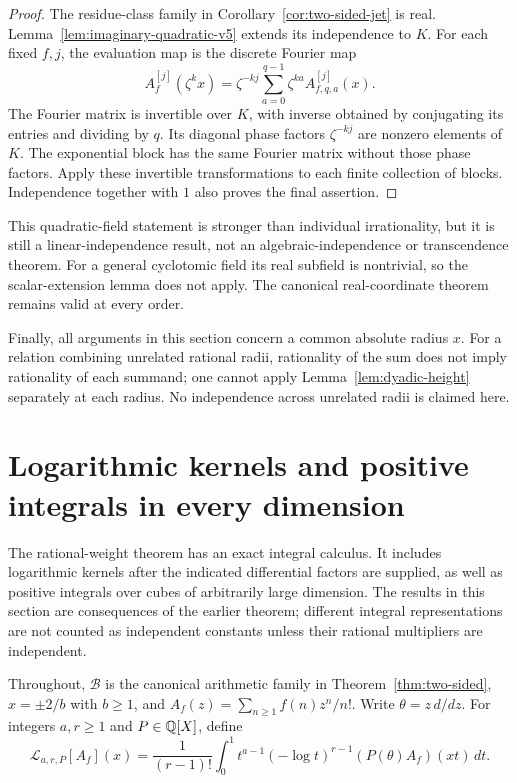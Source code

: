 \begin{proof}
The residue-class family in Corollary~\ref{cor:two-sided-jet} is real.
Lemma~\ref{lem:imaginary-quadratic-v5} extends its independence to $K$.
For each fixed $f,j$, the evaluation map is the discrete Fourier map
\[
 A_f^{[j]}(\zeta^k x)=
 \zeta^{-kj}\sum_{a=0}^{q-1}\zeta^{ka}A_{f,q,a}^{[j]}(x).
\]
The Fourier matrix is invertible over $K$, with inverse obtained
by conjugating its entries and dividing by $q$.  Its diagonal
phase factors $\zeta^{-kj}$ are nonzero elements of $K$.
The exponential block has the same Fourier matrix without those
phase factors.  Apply these invertible transformations to each
finite collection of blocks.  Independence together with $1$
also proves the final assertion.
\end{proof}

This quadratic-field statement is stronger than individual
irrationality, but it is still a linear-independence result, not an
algebraic-independence or transcendence theorem.  For a general
cyclotomic field its real subfield is nontrivial, so the scalar-extension
lemma does not apply.  The canonical real-coordinate theorem remains
valid at every order.

Finally, all arguments in this section concern a common absolute
radius $x$.  For a relation combining unrelated rational radii,
rationality of the sum does not imply rationality of each summand;
one cannot apply Lemma~\ref{lem:dyadic-height} separately at each
radius.  No independence across unrelated radii is claimed here.

\section{Logarithmic kernels and positive integrals in every dimension}
\label{sec:v5-kernel-calculus}

The rational-weight theorem has an exact integral calculus.  It includes
logarithmic kernels after the indicated differential factors are supplied,
as well as positive integrals over cubes of arbitrarily large dimension.
The results in this section are consequences of the earlier theorem; different
integral representations are not counted as independent constants unless
their rational multipliers are independent.

Throughout, $\mathcal B$ is the canonical arithmetic family in
Theorem~\ref{thm:two-sided}, $x=\pm2/b$ with $b\geq1$, and
$A_f(z)=\sum_{n\geq1}f(n)z^n/n!$.  Write $\theta=z\,d/dz$.
For integers $a,r\geq1$ and $P\in\mathbb Q[X]$, define
\[
 \mathscr L_{a,r,P}[A_f](x)=
 \frac1{(r-1)!}\int_0^1
 t^{a-1}(-\log t)^{r-1}(P(\theta)A_f)(xt)\,dt.
\]

